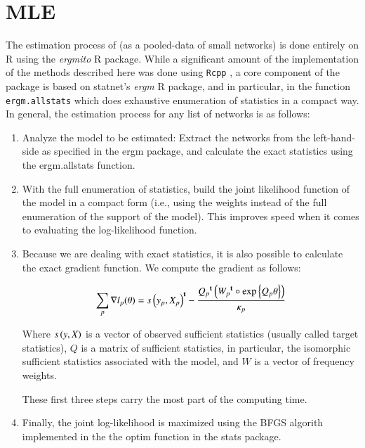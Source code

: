 \documentclass[review, nonatbib,doubleblind]{elsarticle/elsarticle}
\begin{document}

\nocite{R,butts2016,Wickham2016,Leifeld2013} %
\printbibliography

\clearpage

\appendix

\section{MLE\label{appendix:mle}}

The estimation process of \ergmitos{} (as a pooled-data of small networks) is done entirely on R using the \textit{ergmito} R package. While a significant amount of the implementation of the methods described here was done using \texttt{Rcpp} \cite{Eddelbuettel2011}, a core component of the package is based on statnet's \textit{ergm} R package, and in particular, in the function \texttt{ergm.allstats} which does exhaustive enumeration of statistics in a compact way. In general, the estimation process for any list of networks is as follows:

\begin{enumerate}
    \item Analyze the model to be estimated: Extract the networks from the left-hand-side as specified in the ergm package, and calculate the exact statistics using the ergm.allstats function.
    \item With the full enumeration of statistics, build the joint likelihood function of the model in a compact form (i.e., using the weights instead of the full enumeration of the support of the model). This improves speed when it comes to evaluating the log-likelihood function.
    \item Because we are dealing with exact statistics, it is also possible to calculate the exact gradient function. We compute the gradient as follows:
    
    \begin{equation}
    \sum_{p}\nabla l_p(\theta) = {s\left(y_p, X_p\right)}^\mathbf{t} - \frac{{Q_p}^\mathbf{t}\left({W_p}^\mathbf{t} \circ \mbox{exp}\left\{Q_p \theta\right\}\right)}{\kappa_p}
    \end{equation}
    
    Where $s\left(y, X\right)$ is a vector of observed sufficient statistics (usually called target statistics), $Q$ is a matrix of sufficient statistics, in particular, the isomorphic sufficient statistics associated with the model, and $W$ is a vector of frequency weights.
    
    These first three steps carry the most part of the computing time.
    
    \item Finally, the joint log-likelihood is maximized using the BFGS algorith implemented in the the optim function in the stats package.
    
\end{enumerate}
\end{document}
